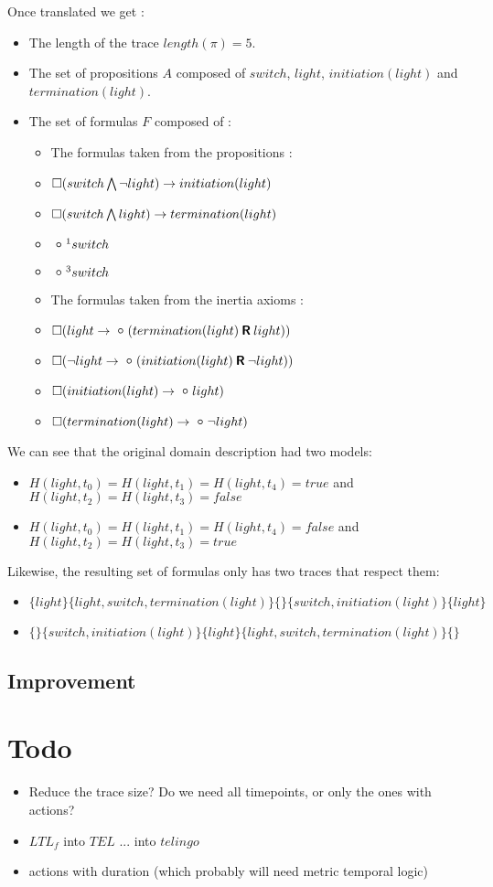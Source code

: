 Once translated we get :
\begin{itemize}
  \item The length of the trace $length(\pi)=5$.
  \item The set of propositions $A$ composed of $switch$, $light$, $initiation(light)$ and $termination(light)$.
  \item The set of formulas $F$ composed of :
  \begin{itemize}
    \item The formulas taken from the propositions :
    \item $\square(switch\bigwedge \neg light)\rightarrow initiation(light)$
    \item $\square(switch\bigwedge light)\rightarrow termination(light)$
    \item $\next^{1}switch$
    \item $\next^{3}switch$
    \item The formulas taken from the inertia axioms :
    \item $\alwaysF(light\rightarrow\next (termination(light) \release light))$
    \item $\alwaysF(\neg light\rightarrow\next (initiation(light) \release \neg light))$
    \item $\alwaysF(initiation(light)\rightarrow\next light)$
    \item $\alwaysF(termination(light)\rightarrow\next \neg light)$
  \end{itemize}
\end{itemize}

We can see that the original domain description had two models:
\begin{itemize}
  \item $H(light,t_0)=H(light,t_1)=H(light,t_4)=true$ and $H(light,t_2)=H(light,t_3)=false$
  \item $H(light,t_0)=H(light,t_1)=H(light,t_4)=false$ and $H(light,t_2)=H(light,t_3)=true$
\end{itemize}

Likewise, the resulting set of formulas only has two traces that respect them:
\begin{itemize}
  \item $\{light\}\{light,switch,termination(light)\}\{\}\{switch,initiation(light)\}\{light\}$
  \item $\{\}\{switch,initiation(light)\}\{light\}\{light,switch,termination(light)\}\{\}$
\end{itemize}

\subsection{Improvement}




\section{Todo}

\begin{itemize}
  \item Reduce the trace size? Do we need all timepoints, or only the ones with actions?
  \item $LTL_f$ into $TEL$ ... into $telingo$
  \item actions with duration (which probably will need metric temporal logic)
\end{itemize}
